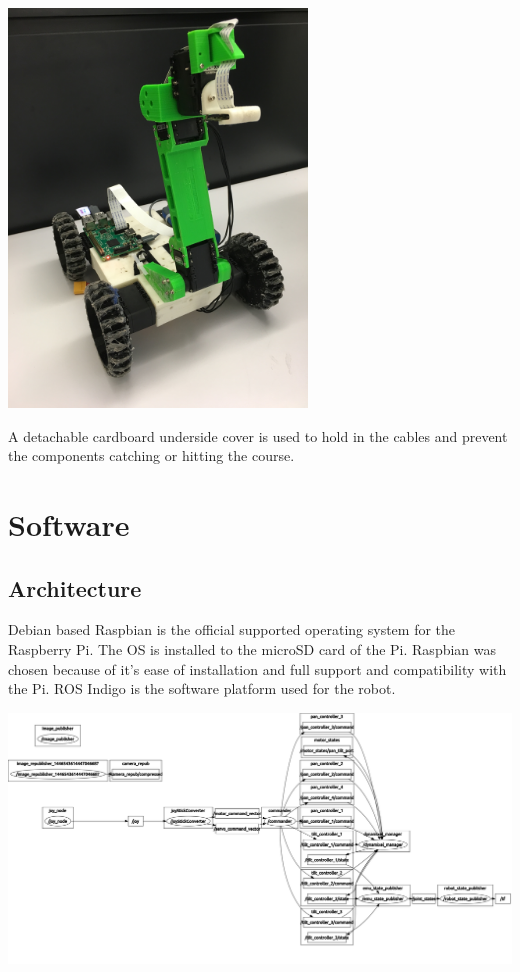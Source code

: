 \documentclass[titlepage,12pt,a4paper]{article}
\begin{document}
\begin{center}
    \noindent \includegraphics[height=300pt]{robot}
\end{center}

\noindent A detachable cardboard underside cover is used to hold in the cables and prevent the components catching or hitting the course.

\section{Software}
\subsection{Architecture}
Debian based Raspbian is the official supported operating system for the Raspberry Pi. The OS is installed to the microSD card of the Pi. Raspbian was chosen because of it’s ease of installation and full support and compatibility with the Pi. ROS Indigo is the software platform used for the robot.

\includegraphics[width=\textwidth]{rosgraph.pdf}
\end{document}
